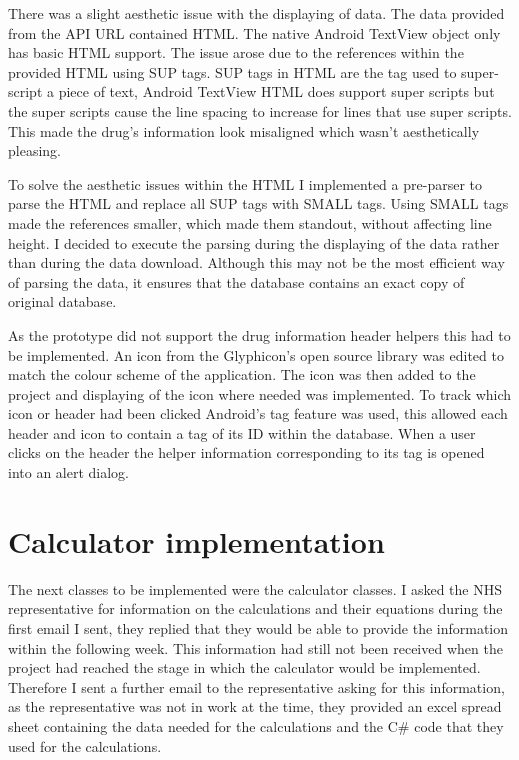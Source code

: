 There was a slight aesthetic issue with the displaying of data. The data provided from the API URL contained HTML. The native Android TextView object only has basic HTML support. The issue arose due to the references within the provided HTML using SUP tags. SUP tags in HTML are the tag used to super-script a piece of text, Android TextView HTML does support super scripts but the super scripts cause the line spacing to increase for lines that use super scripts. This made the drug's information look misaligned which wasn't aesthetically pleasing. 

To solve the aesthetic issues within the HTML I implemented a pre-parser to parse the HTML and replace all SUP tags with SMALL tags. Using SMALL tags made the references smaller, which made them standout, without affecting line height. I decided to execute the parsing during the displaying of the data rather than during the data download. Although this may not be the most efficient way of parsing the data, it ensures that the database contains an exact copy of original database.

As the prototype did not support the drug information header helpers this had to be implemented. An icon from the Glyphicon's open source library \cite{glyph} was edited to match the colour scheme of the application. The icon was then added to the project and displaying of the icon where needed was implemented. To track which icon or header had been clicked Android's tag feature was used, this allowed each header and icon to contain a tag of its ID within the database. When a user clicks on the header the helper information corresponding to its tag is opened into an alert dialog.


\section{Calculator implementation}

The next classes to be implemented were the calculator classes.  I asked the NHS representative for information on the calculations and their equations during the first email I sent, they replied that they would be able to provide the information within the following week. This information had still not been received when the project had reached the stage in which the calculator would be implemented. Therefore I sent a further email to the representative asking for this information, as the representative was not in work at the time, they provided an excel spread sheet containing the data needed for the calculations and the C\# code that they used for the calculations. 

